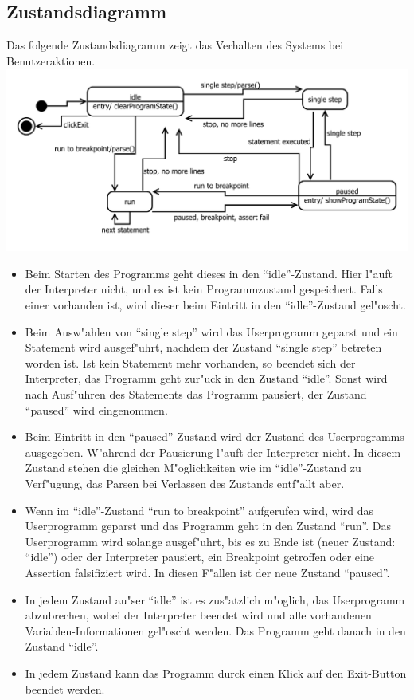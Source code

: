 \documentclass[10pt,a4paper,titlepage]{article}
\begin{document}
\subsection{Zustandsdiagramm}
Das folgende Zustandsdiagramm zeigt das Verhalten des Systems bei Benutzeraktionen. \\
\includegraphics[scale=0.9]{images/Zustand.pdf}\\
\begin{itemize}
\item Beim Starten des Programms geht dieses in den "`idle"'-Zustand. Hier l"auft der Interpreter nicht, und es ist kein Programmzustand gespeichert. Falls einer vorhanden ist, wird dieser beim Eintritt in den "`idle"'-Zustand gel"oscht.
\item Beim Ausw"ahlen von "`single step"' wird das Userprogramm geparst und ein Statement wird ausgef"uhrt, nachdem der Zustand "`single step"' betreten worden ist. Ist kein Statement mehr vorhanden, so beendet sich der Interpreter, das Programm geht zur"uck in den Zustand "`idle"'. Sonst wird nach Ausf"uhren des Statements das Programm pausiert, der Zustand "`paused"' wird eingenommen. 
\item Beim Eintritt in den "`paused"'-Zustand wird der Zustand des Userprogramms ausgegeben. W"ahrend der Pausierung l"auft der Interpreter nicht. In diesem Zustand stehen die gleichen M"oglichkeiten wie im "`idle"'-Zustand zu Verf"ugung, das Parsen bei Verlassen des Zustands entf"allt aber.
\item Wenn im "`idle"'-Zustand "`run to breakpoint"' aufgerufen wird, wird das Userprogramm geparst und das Programm geht in den Zustand "`run"'. Das Userprogramm wird solange ausgef"uhrt, bis es zu Ende ist (neuer Zustand: "`idle"') oder der Interpreter pausiert, ein Breakpoint getroffen oder eine Assertion falsifiziert wird. In diesen F"allen ist der neue Zustand "`paused"'.
\item In jedem Zustand au"ser "`idle"' ist es zus"atzlich m"oglich, das Userprogramm abzubrechen, wobei der Interpreter beendet wird und alle vorhandenen Variablen-Informationen gel"oscht werden. Das Programm geht danach in den Zustand "`idle"'.
\item In jedem Zustand kann das Programm durck einen Klick auf den Exit-Button beendet werden.
\end{itemize}
\newpage
\end{document}
